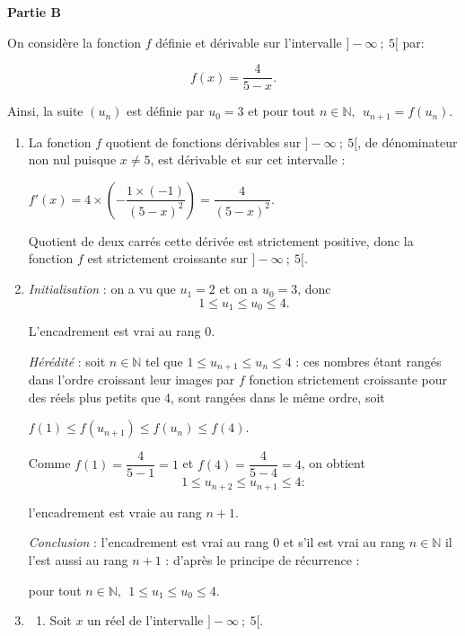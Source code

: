 \documentclass[10pt]{article}
\providecommand{\N}{\mathbb{N}}
\begin{document}
\medskip

\textbf{Partie B}

\medskip

On considère la fonction $f$ définie et dérivable sur l'intervalle $] -\infty~;~5[$ par:

\[f(x) = \dfrac{4}{5 - x}.\]

Ainsi, la suite $\left(u_n\right)$ est définie par $u_0 = 3$ et pour tout $n \in \N,\:\: u_{n+1}  = f\left(u_n\right)$.

\medskip

\begin{enumerate}
\item 
La fonction $f$ quotient de fonctions dérivables sur $]-\infty~;~5[$, de dénominateur non nul puisque $x \ne 5$, est dérivable et sur cet intervalle :

$f'(x) = 4 \times \left(- \dfrac{1 \times (-1)}{(5 - x)^2}\right) = \dfrac{4}{(5 - x)^2}$.

Quotient de deux carrés cette dérivée est strictement positive, donc la fonction $f$ est strictement croissante sur $]-\infty~;~5[$.
\item 

\emph{Initialisation} : on a vu que $u_1 = 2$ et on a $u_0 = 3$, donc 
\[1 \leqslant u_{1} \leqslant u_0 \leqslant 4.\]

L'encadrement est vrai au rang 0.

\emph{Hérédité} : soit $n \in \N$ tel que $1 \leqslant u_{n+1} \leqslant u_n \leqslant 4$ : ces nombres étant rangés dans l'ordre croissant leur images par $f$ fonction strictement croissante  pour des réels plus petits que 4, sont rangées dans le même ordre, soit 

$f(1) \leqslant f\left(u_{n+1}\right) \leqslant f\left(u_{n}\right) \leqslant f(4)$.

Comme $f(1) = \dfrac{4}{5 - 1} = 1$ et $f(4) = \dfrac{4}{5 - 4} = 4$, on obtient 
\[1 \leqslant u_{n+2} \leqslant u_{n+1} \leqslant 4 :\]

l'encadrement est vraie au rang $n + 1$.

\emph{Conclusion} : l'encadrement est vrai au rang 0 et s'il est vrai au rang $n \in \N$ il l'est aussi au rang $n + 1$ : d'après le principe de récurrence :

pour tout $n \in \N, \: \: 1 \leqslant u_{1} \leqslant u_0 \leqslant 4$.
\item 
	\begin{enumerate}
		\item Soit $x$ un réel de l'intervalle $]-\infty~;~5[$.





\end{enumerate}
\end{enumerate}
\end{document}
